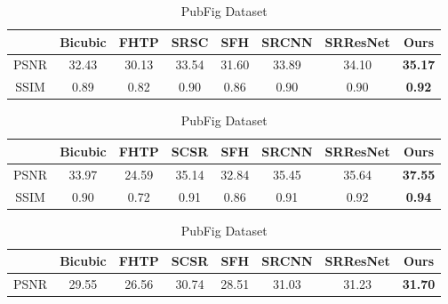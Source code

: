 \documentclass{article}
\begin{document}
\def\pp{\hspace{0mm}}
\renewcommand{\tabcolsep}{5pt}
\begin{table}[t]
\caption{Multi-PIE Frontal Dataset}
\centering
       \vspace{-3mm}\begin{tabular}{cccccccc}
        \toprule
        \scriptsize{}&\scriptsize{Bicubic}&\scriptsize{FHTP}\pp&
        \pp\scriptsize{SRSC}&\pp\scriptsize{SFH}&\pp\scriptsize{SRCNN}
        &\pp\scriptsize{SRResNet}&\pp\scriptsize{Ours}\\
        \midrule
        \scriptsize{PSNR}&\scriptsize{32.43}
        &\scriptsize{30.13}\pp&\pp\scriptsize{33.54}&\pp\scriptsize{31.60}&\pp\scriptsize{33.89}&\pp\scriptsize{34.10}&\pp\scriptsize{\textbf{35.17}}\\
        \scriptsize{SSIM}&\scriptsize{0.89}
        &\scriptsize{0.82}\pp&\scriptsize{0.90}&\pp\scriptsize{0.86}&\pp\scriptsize{0.90}&\pp\scriptsize{0.90}&\pp\scriptsize{\textbf{0.92}}\\
        \bottomrule
       \end{tabular}
\label{tab:frontal}
\caption{Multi-PIE Pose Dataset}
\centering
       \vspace{-3mm}\begin{tabular}{cccccccc}
        \toprule
        \scriptsize{}&\scriptsize{Bicubic}&\scriptsize{FHTP}\pp
        &\pp\scriptsize{SCSR}&\pp\scriptsize{SFH}&\pp\scriptsize{SRCNN}
        &\pp\scriptsize{SRResNet}&\pp\scriptsize{Ours}\\
        \midrule
        \scriptsize{PSNR}&\scriptsize{33.97}&\scriptsize{24.59}\pp&\pp\scriptsize{35.14}&\pp\scriptsize{32.84}&\pp\scriptsize{35.45}&\pp\scriptsize{35.64}&\pp\scriptsize{\textbf{37.55}}\\
        \scriptsize{SSIM}&\scriptsize{0.90}&\scriptsize{0.72}\pp&\pp\scriptsize{0.91}&\pp\scriptsize{0.86}&\pp\scriptsize{0.91}&\pp\scriptsize{0.92}&\pp\scriptsize{\textbf{0.94}}\\
        \bottomrule
       \end{tabular}
\label{tab:pose}
\caption{PubFig Dataset}
\centering
       \vspace{-3mm}\begin{tabular}{cccccccc}
        \toprule
        \scriptsize{}&\scriptsize{Bicubic}&\scriptsize{FHTP}\pp
        &\pp\scriptsize{SCSR}&\pp\scriptsize{SFH}&\pp\scriptsize{SRCNN}
        &\pp\scriptsize{SRResNet}&\pp\scriptsize{Ours}\\
        \midrule
        \scriptsize{PSNR}&\scriptsize{29.55}\pp&\pp\scriptsize{26.56}&\pp\scriptsize{30.74}&\pp\scriptsize{28.51}&\pp\scriptsize{31.03}&\pp\scriptsize{31.23}&\pp\scriptsize{\textbf{31.70}}\\

\end{tabular}
\end{table}
\end{document}
